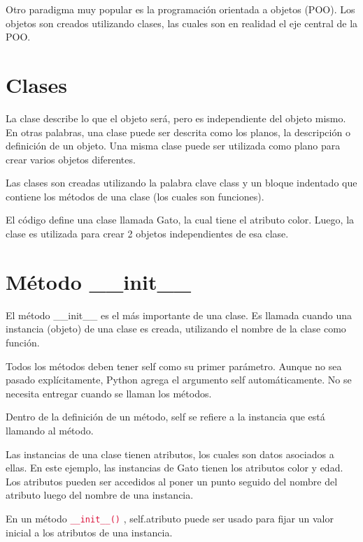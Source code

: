 \documentclass{report}
\newcommand{\ttt}[1]{
  \textcolor{Crimson}{\texttt{#1}}
}
\begin{document}
Otro paradigma muy popular es la programación orientada a objetos (POO). Los objetos son creados utilizando clases, las cuales son en realidad el eje central de la POO.

\section{Clases}

La clase describe lo que el objeto será, pero es independiente del objeto mismo. En otras palabras, una clase puede ser descrita como los planos, la descripción o definición de un objeto. Una misma clase puede ser utilizada como plano para crear varios objetos diferentes.\smallskip

Las clases son creadas utilizando la palabra clave class y un bloque indentado que contiene los métodos de una clase (los cuales son funciones).


El código define una clase llamada Gato, la cual tiene el atributo color. Luego, la clase es utilizada para crear 2 objetos independientes de esa clase.

\section{Método \_\_init\_\_}

El método \_\_init\_\_ es el más importante de una clase. Es llamada cuando una instancia (objeto) de una clase es creada, utilizando el nombre de la clase como función.\smallskip

Todos los métodos deben tener self como su primer parámetro. Aunque no sea pasado explícitamente, Python agrega el argumento self automáticamente. No se necesita entregar cuando se llaman los métodos.\smallskip

Dentro de la definición de un método, self se refiere a la instancia que está llamando al método.\smallskip

Las instancias de una clase tienen atributos, los cuales son datos asociados a ellas. En este ejemplo, las instancias de Gato tienen los atributos color y edad. Los atributos pueden ser accedidos al poner un punto seguido del nombre del atributo luego del nombre de una instancia.


En un método \ttt{\_\_init\_\_()}, self.atributo puede ser usado para fijar un valor inicial a los atributos de una instancia.\smallskip
\end{document}
